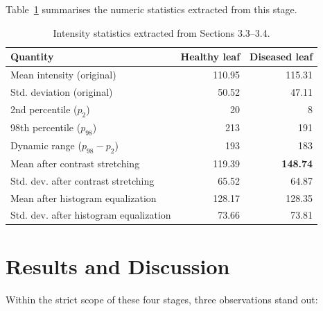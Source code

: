 \documentclass[11pt,a4paper]{article}
\begin{document}
Table~\ref{tab:stats} summarises the numeric statistics extracted from this stage.

\begin{table}[h]
\centering
\caption{Intensity statistics extracted from Sections 3.3--3.4.}
\label{tab:stats}
\begin{tabular}{lrr}
\toprule
Quantity & Healthy leaf & Diseased leaf \\
\midrule
Mean intensity (original) & 110.95 & 115.31 \\
Std. deviation (original) & 50.52 & 47.11 \\
2nd percentile ($p_2$) & 20 & 8 \\
98th percentile ($p_{98}$) & 213 & 191 \\
Dynamic range ($p_{98}-p_2$) & 193 & 183 \\
Mean after contrast stretching & 119.39 & \textbf{148.74} \\
Std. dev. after contrast stretching & 65.52 & 64.87 \\
Mean after histogram equalization & 128.17 & 128.35 \\
Std. dev. after histogram equalization & 73.66 & 73.81 \\
\bottomrule
\end{tabular}
\end{table}

\section{Results and Discussion}

Within the strict scope of these four stages, three observations stand out:
\end{document}
